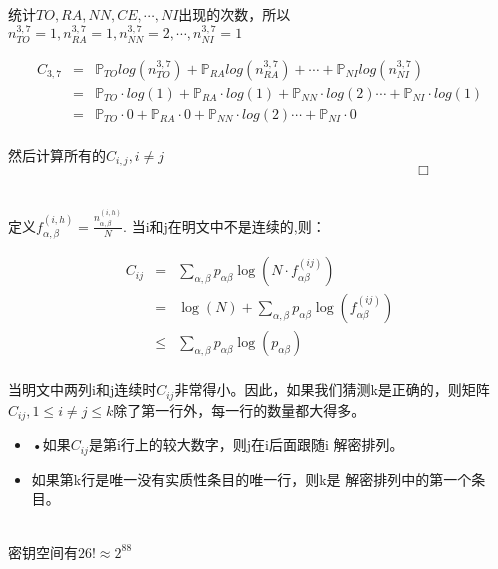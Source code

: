\documentclass{article}
\begin{document}
统计$TO,RA,NN,CE,\cdots ,NI$出现的次数，所以$n^{3,7}_{TO} = 1,n^{3,7}_{RA} = 1,n^{3,7}_{NN} = 2,\cdots,n^{3,7}_{NI} = 1$


\begin{eqnarray}   
\label{eq}
C_{3,7} &=& \mathbb{P}_{TO}log(n^{3,7}_{TO}) + \mathbb{P}_{RA}log(n^{3,7}_{RA} ) + \cdots + \mathbb{P}_{NI}log(n^{3,7}_{NI}) \nonumber \\ 
&=& \mathbb{P}_{TO}\cdot log(1) + \mathbb{P}_{RA}\cdot log(1) + \mathbb{P}_{NN}\cdot log(2)  \cdots + \mathbb{P}_{NI}\cdot log(1) \nonumber \\ 
&=& \mathbb{P}_{TO} \cdot 0 + \mathbb{P}_{RA}\cdot 0 +\mathbb{P}_{NN} \cdot log(2) \cdots + \mathbb{P}_{NI} \cdot 0\nonumber \\ 
\nonumber
\end{eqnarray}

然后计算所有的$C_{i,j}, i \ne j$
$\quad\quad\quad\quad\quad\quad\quad\quad\quad\quad\quad\quad\quad\quad\quad\quad\quad\quad\quad\quad\quad\quad\quad\quad\quad\quad\quad\quad\quad\Box$

~\\

定义$f_{\alpha, \beta}^{(i,h)}=\frac{n_{\alpha, \beta}^{(i,h)}}{N}$. 当i和j在明文中不是连续的,则：


\begin{eqnarray}   
C_{i j} &=&\sum_{\alpha, \beta} p_{\alpha \beta} \log \left(N \cdot f_{\alpha \beta}^{(i j)}\right) \nonumber \\
&=&\log (N)+\sum_{\alpha, \beta} p_{\alpha \beta} \log \left(f_{\alpha \beta}^{(i j)}\right) \nonumber \\ 
& \leq& \sum_{\alpha, \beta} p_{\alpha \beta} \log \left(p_{\alpha \beta}\right)\nonumber \\ 
\end{eqnarray}

当明文中两列i和j连续时$C_{ij}$非常得小。因此，如果我们猜测k是正确的，则矩阵$C_{ij},1 \leq i \ne j\leq k$除了第一行外，每一行的数量都大得多。

\begin{itemize}
\item •如果$C_{ij}$是第i行上的较大数字，则j在i后面跟随i
解密排列。
\item 如果第k行是唯一没有实质性条目的唯一行，则k是
解密排列中的第一个条目。
\end{itemize}

~\\

密钥空间有$26! \approx 2^{88}$
\end{document}
